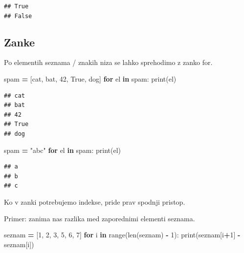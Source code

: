 \documentclass[
]{report}
\newenvironment{Shaded}{\begin{snugshade}}{\end{snugshade}}
\newcommand{\BuiltInTok}[1]{#1}
\newcommand{\ControlFlowTok}[1]{\textcolor[rgb]{0.13,0.29,0.53}{\textbf{#1}}}
\newcommand{\DecValTok}[1]{\textcolor[rgb]{0.00,0.00,0.81}{#1}}
\newcommand{\KeywordTok}[1]{\textcolor[rgb]{0.13,0.29,0.53}{\textbf{#1}}}
\newcommand{\NormalTok}[1]{#1}
\newcommand{\OperatorTok}[1]{\textcolor[rgb]{0.81,0.36,0.00}{\textbf{#1}}}
\newcommand{\StringTok}[1]{\textcolor[rgb]{0.31,0.60,0.02}{#1}}
\newcommand{\VariableTok}[1]{\textcolor[rgb]{0.00,0.00,0.00}{#1}}
\begin{document}
\begin{verbatim}
## True
## False
\end{verbatim}

\hypertarget{zanke-1}{%
\subsection{Zanke}\label{zanke-1}}

Po elementih seznama / znakih niza se lahko sprehodimo z zanko for.

\begin{Shaded}
\begin{Highlighting}[]
\NormalTok{spam }\OperatorTok{=}\NormalTok{ [}\StringTok{\textquotesingle{}cat\textquotesingle{}}\NormalTok{, }\StringTok{\textquotesingle{}bat\textquotesingle{}}\NormalTok{, }\DecValTok{42}\NormalTok{, }\VariableTok{True}\NormalTok{, }\StringTok{\textquotesingle{}dog\textquotesingle{}}\NormalTok{]}
\ControlFlowTok{for}\NormalTok{ el }\KeywordTok{in}\NormalTok{ spam:}
    \BuiltInTok{print}\NormalTok{(el)}
\end{Highlighting}
\end{Shaded}

\begin{verbatim}
## cat
## bat
## 42
## True
## dog
\end{verbatim}

\begin{Shaded}
\begin{Highlighting}[]
\NormalTok{spam }\OperatorTok{=} \StringTok{"abc"}
\ControlFlowTok{for}\NormalTok{ el }\KeywordTok{in}\NormalTok{ spam:}
    \BuiltInTok{print}\NormalTok{(el)}
\end{Highlighting}
\end{Shaded}

\begin{verbatim}
## a
## b
## c
\end{verbatim}

Ko v zanki potrebujemo indekse, pride prav spodnji pristop.

Primer: zanima nas razlika med zaporednimi elementi seznama.

\begin{Shaded}
\begin{Highlighting}[]
\NormalTok{seznam }\OperatorTok{=}\NormalTok{ [}\DecValTok{1}\NormalTok{, }\DecValTok{2}\NormalTok{, }\DecValTok{3}\NormalTok{, }\DecValTok{5}\NormalTok{, }\DecValTok{6}\NormalTok{, }\DecValTok{7}\NormalTok{]}
\ControlFlowTok{for}\NormalTok{ i }\KeywordTok{in} \BuiltInTok{range}\NormalTok{(}\BuiltInTok{len}\NormalTok{(seznam) }\OperatorTok{{-}} \DecValTok{1}\NormalTok{):}
    \BuiltInTok{print}\NormalTok{(seznam[i}\OperatorTok{+}\DecValTok{1}\NormalTok{] }\OperatorTok{{-}}\NormalTok{ seznam[i])}
\end{Highlighting}
\end{Shaded}
\end{document}

